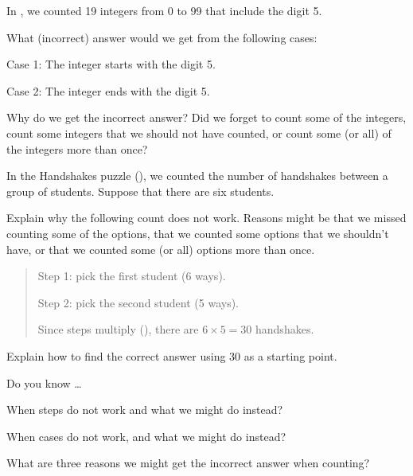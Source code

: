 \begin{exer}[\exerP] %
\label{exer_count100_awry}
    In , we counted 19 integers from 0 to 99 that include the digit 5.  
        \begin{exerpart}
            \item What (incorrect) answer would we get from the following cases:

                Case 1: The integer starts with the digit 5.  

                Case 2: The integer ends with the digit 5.  
            \item Why do we get the incorrect answer?  Did we forget to count some of the integers, count some integers that we should not have counted, or count some (or all) of the integers more than once?
        \end{exerpart}  
\end{exer}

\begin{exer}[\exerU] %
\label{exer_double_count_hs}
    In the Handshakes puzzle (), we counted the number of handshakes between a group of students.  Suppose that there are six students.
        \begin{exerpart}
            \item Explain why the following count does not work.  Reasons might be that we missed counting some of the options, that we counted some options that we shouldn't have, or that we counted some (or all) options more than once.
            \begin{quote}
                Step 1: pick the first student (6 ways).
                
                Step 2: pick the second student (5 ways). 
                
                Since steps multiply (), there are $6 \times 5=30$ handshakes.   
            \end{quote}
            \item Explain how to find the correct answer using 30 as a starting point.
        \end{exerpart}   
\end{exer}

\begin{exer}[\exerR] %
\label{exer_dyk_counting_awry}
    Do you know \ldots
        \begin{exerpart}
            \item When steps do not work and what we might do instead?
            \item When cases do not work, and what we might do instead? 
            \item What are three reasons we might get the incorrect answer when counting?
        \end{exerpart}
\end{exer}

